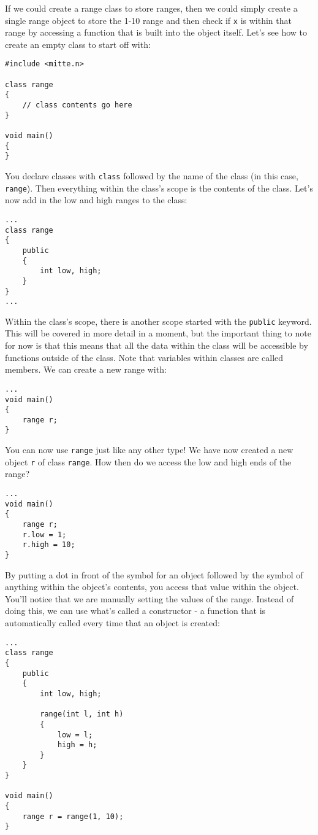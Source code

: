 \documentclass[10pt,a4paper]{article}
\begin{document}
If we could create a range class to store ranges, then we could simply create a single range object to store the 1-10 range and then check if \verb|x| is within that range by accessing a function that is built into the object itself. Let's see how to create an empty class to start off with:
\begin{verbatim}
#include <mitte.n>

class range
{
    // class contents go here
}

void main()
{
}
\end{verbatim}

You declare classes with \verb|class| followed by the name of the class (in this case, \verb|range|). Then everything within the class's scope is the contents of the class. Let's now add in the low and high ranges to the class:
\begin{verbatim}
...
class range
{
    public
    {
        int low, high;
    }
}
...
\end{verbatim}

Within the class's scope, there is another scope started with the \verb|public| keyword. This will be covered in more detail in a moment, but the important thing to note for now is that this means that all the data within the class will be accessible by functions outside of the class. Note that variables within classes are called members. We can create a new range with:
\begin{verbatim}
...
void main()
{
    range r;
}
\end{verbatim}

You can now use \verb|range| just like any other type! We have now created a new object \verb|r| of class \verb|range|. How then do we access the low and high ends of the range?
\begin{verbatim}
...
void main()
{
    range r;
    r.low = 1;
    r.high = 10;
}
\end{verbatim}

By putting a dot in front of the symbol for an object followed by the symbol of anything within the object's contents, you access that value within the object. You'll notice that we are manually setting the values of the range. Instead of doing this, we can use what's called a constructor - a function that is automatically called every time that an object is created:
\begin{verbatim}
...
class range
{
    public
    {
        int low, high;
        
        range(int l, int h)
        {
            low = l;
            high = h;
        }
    }
}

void main()
{
    range r = range(1, 10);
}
\end{verbatim}
\end{document}
